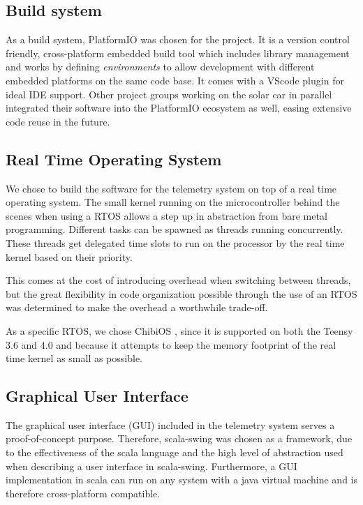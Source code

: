 \documentclass[a4paper,conference]{IEEEtran}
\begin{document}
\subsection{Build system}
As a build system, PlatformIO \cite{platformIO} was chosen for the project. It is a version control friendly, cross-platform embedded build tool which includes library management and works by defining \textit{environments} to allow development with different embedded platforms on the same code base. It comes with a VScode plugin for ideal IDE support. Other project groups working on the solar car in parallel integrated their software into the PlatformIO ecosystem as well, easing extensive code reuse in the future.

\subsection{Real Time Operating System}
We chose to build the software for the telemetry system on top of a real time operating system. The small kernel running on the microcontroller behind the scenes when using a RTOS allows a step up in abstraction from bare metal programming. Different tasks can be spawned as threads running concurrently. These threads get delegated time slots to run on the processor by the real time kernel based on their priority.

This comes at the cost of introducing overhead when switching between threads, but the great flexibility in code organization possible through the use of an RTOS was determined to make the overhead a worthwhile trade-off.

As a specific RTOS, we chose ChibiOS \cite{chibios}, since it is supported on both the Teensy 3.6 and 4.0 and because it attempts to keep the memory footprint of the real time kernel as small as possible.

\subsection{Graphical User Interface} %

The graphical user interface (GUI) included in the telemetry system serves a proof-of-concept purpose. Therefore, scala-swing \cite{scala-swing} was chosen as a framework, due to the effectiveness of the scala \cite{scala} language and the high level of abstraction used when describing a user interface in scala-swing. Furthermore, a GUI implementation in scala can run on any system with a java virtual machine and is therefore cross-platform compatible.
\end{document}
